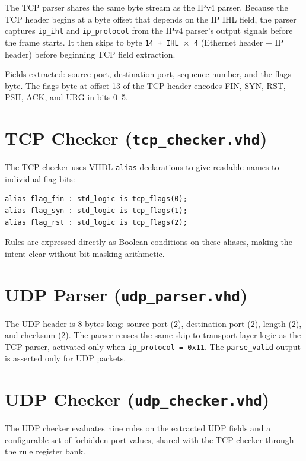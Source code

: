 \documentclass[12pt, a4paper]{report}
\begin{document}
The TCP parser shares the same byte stream as the IPv4 parser. Because the TCP header begins at a byte offset that depends on the IP IHL field, the parser captures \texttt{ip\_ihl} and \texttt{ip\_protocol} from the IPv4 parser's output signals before the frame starts. It then skips to byte \texttt{14 + IHL\,$\times$\,4} (Ethernet header + IP header) before beginning TCP field extraction.

Fields extracted: source port, destination port, sequence number, and the flags byte. The flags byte at offset 13 of the TCP header encodes FIN, SYN, RST, PSH, ACK, and URG in bits 0--5.

\section{TCP Checker (\texttt{tcp\_checker.vhd})}

The TCP checker uses VHDL \texttt{alias} declarations to give readable names to individual flag bits:

\begin{lstlisting}[caption={Flag aliases in \texttt{tcp\_checker.vhd}}, label=lst:aliases]
alias flag_fin : std_logic is tcp_flags(0);
alias flag_syn : std_logic is tcp_flags(1);
alias flag_rst : std_logic is tcp_flags(2);
\end{lstlisting}

Rules are expressed directly as Boolean conditions on these aliases, making the intent clear without bit-masking arithmetic.

\section{UDP Parser (\texttt{udp\_parser.vhd})}

The UDP header is 8 bytes long: source port (2), destination port (2), length (2), and checksum (2). The parser reuses the same skip-to-transport-layer logic as the TCP parser, activated only when \texttt{ip\_protocol = 0x11}. The \texttt{parse\_valid} output is asserted only for UDP packets.

\section{UDP Checker (\texttt{udp\_checker.vhd})}

The UDP checker evaluates nine rules on the extracted UDP fields and a configurable set of forbidden port values, shared with the TCP checker through the rule register bank.
\end{document}
